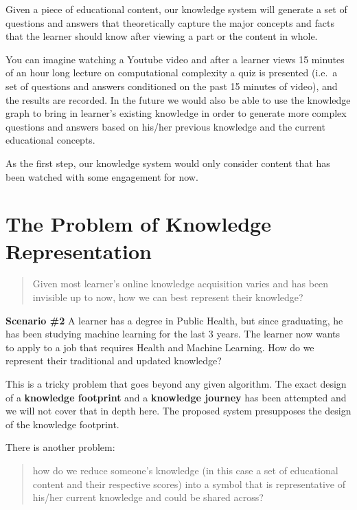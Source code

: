 \documentclass[]{book}
\theoremstyle{definition}
\theoremstyle{definition}
\theoremstyle{definition}
\theoremstyle{remark}
\begin{document}
Given a piece of educational content, our knowledge system will generate
a set of questions and answers that theoretically capture the major
concepts and facts that the learner should know after viewing a part or
the content in whole.

You can imagine watching a Youtube video and after a learner views 15
minutes of an hour long lecture on computational complexity a quiz is
presented (i.e.~a set of questions and answers conditioned on the past
15 minutes of video), and the results are recorded. In the future we
would also be able to use the knowledge graph to bring in learner's
existing knowledge in order to generate more complex questions and
answers based on his/her previous knowledge and the current educational
concepts.

As the first step, our knowledge system would only consider content that
has been watched with some engagement for now.

\section{The Problem of Knowledge
Representation}\label{the-problem-of-knowledge-representation}

\begin{quote}
Given most learner's online knowledge acquisition varies and has been
invisible up to now, how we can best represent their knowledge?
\end{quote}

\textbf{Scenario \#2} A learner has a degree in Public Health, but since
graduating, he has been studying machine learning for the last 3 years.
The learner now wants to apply to a job that requires Health and Machine
Learning. How do we represent their traditional and updated knowledge?

This is a tricky problem that goes beyond any given algorithm. The exact
design of a \textbf{knowledge footprint} and a \textbf{knowledge
journey} has been attempted and we will not cover that in depth here.
The proposed system presupposes the design of the knowledge footprint.

There is another problem:

\begin{quote}
how do we reduce someone's knowledge (in this case a set of educational
content and their respective scores) into a symbol that is
representative of his/her current knowledge and could be shared across?
\end{quote}
\end{document}
